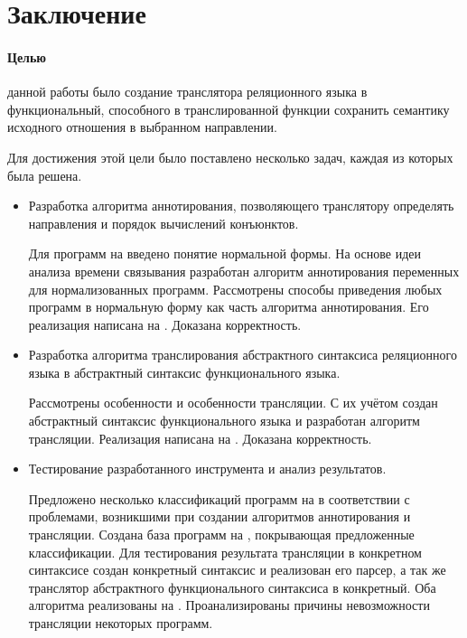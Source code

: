 \section*{Заключение}

\paragraph{Целью} данной работы было создание транслятора реляционного языка в функциональный, способного в транслированной функции сохранить семантику исходного отношения в выбранном направлении.

Для достижения этой цели было поставлено несколько задач, каждая из которых была решена.

\begin{itemize}
    \item Разработка алгоритма аннотирования, позволяющего транслятору определять направления и порядок вычислений конъюнктов.
    
    Для программ на \miniKanren{} введено понятие нормальной формы. На основе идеи анализа времени связывания разработан алгоритм аннотирования переменных для нормализованных программ. Рассмотрены способы приведения любых программ в нормальную форму как часть алгоритма аннотирования. Его реализация написана на \haskell{}. Доказана корректность.

    \item Разработка алгоритма транслирования абстрактного синтаксиса реляционного языка в абстрактный синтаксис функционального языка.

    Рассмотрены особенности \miniKanren{} и особенности трансляции. С их учётом создан абстрактный синтаксис функционального языка и разработан алгоритм трансляции. Реализация написана на \haskell{}. Доказана корректность.
    
    \item Тестирование разработанного инструмента и анализ результатов.
    
    Предложено несколько классификаций программ на \miniKanren{} в соответствии с проблемами, возникшими при создании алгоритмов аннотирования и трансляции. Создана база программ на \miniKanren{}, покрывающая предложенные классификации. Для тестирования результата трансляции в конкретном синтаксисе создан конкретный синтаксис \miniKanren{} и реализован его парсер, а так же транслятор абстрактного функционального синтаксиса в конкретный. Оба алгоритма реализованы на \haskell{}. Проанализированы причины невозможности трансляции некоторых программ.
    
\end{itemize}